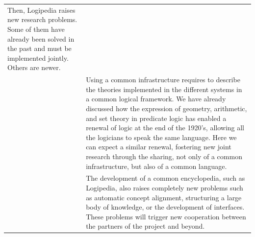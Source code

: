 \begin{longtable}{|p{}|p{}|}
Then, Logipedia raises new research
problems. Some of them have already been solved in the past and
must be implemented jointly. Others are newer.\\
&
\hspace{0.4cm}
Using a common infrastructure requires
to describe the theories implemented in the different systems in a
common logical framework. We have already discussed how the expression
of geometry, arithmetic, and set theory in predicate logic has
enabled a renewal of logic at the end of the 1920's, allowing all
the logicians to speak the same language. Here we can expect a similar
renewal, fostering new joint research through the sharing, not
only of a common infrastructure, but also of a common language.\\
&
\hspace{0.4cm}
The development of a common encyclopedia, such as Logipedia, also
raises completely new problems such as automatic concept alignment,
structuring a large body of knowledge, or the development of
interfaces. These problems will trigger new cooperation between the
partners of the project and beyond.\\
\hline
\end{longtable}



